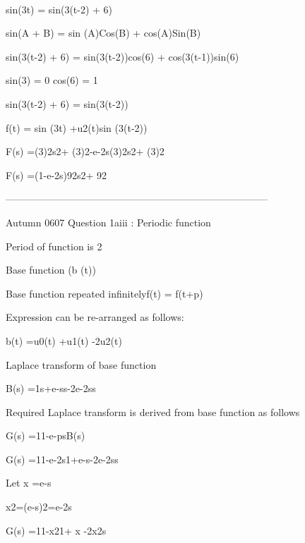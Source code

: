 




sin(3t) = sin(3(t-2) + 6)


sin(A + B) = sin (A)Cos(B) + cos(A)Sin(B) 


sin(3(t-2) + 6) = sin(3(t-2))cos(6) + cos(3(t-1))sin(6)


sin(3) = 0              cos(6) = 1


sin(3(t-2) + 6) = sin(3(t-2))


f(t) = sin (3t) +u2(t)sin (3(t-2))


F(s) =(3)2s2+ (3)2-e-2s(3)2s2+ (3)2


F(s) =(1-e-2s)92s2+ 92

 

--------------------------------------------------------------------------------


 

Autumn 0607 Question 1aiii : Periodic function

 

Period of function is 2

 

Base function (b (t))

 

Base function repeated infinitelyf(t) = f(t+p)


Expression can be re-arranged as follows:

 

b(t) =u0(t) +u1(t) -2u2(t) 

 

Laplace transform of base function

 

B(s) =1s+e-ss-2e-2ss 

 

 

Required Laplace transform is derived from base function as follows

 

 

G(s) =11-e-psB(s) 

 

G(s) =11-e-2s1+e-s-2e-2ss 

 

 

 

Let     x =e-s

 

        x2=(e-s)2=e-2s

 

G(s) =11-x21+ x -2x2s

 

